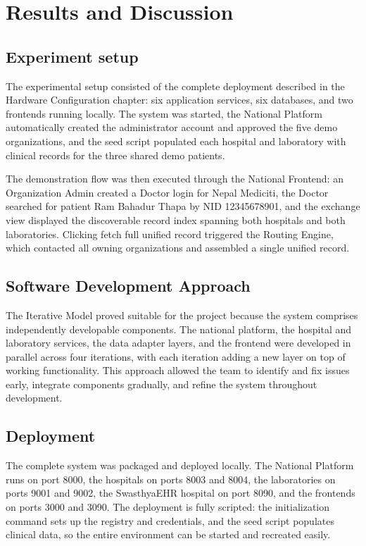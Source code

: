 \documentclass[12pt]{report}
\numberwithin{equation}{chapter}
\begin{document}
\chapter{Results and Discussion}

\section{Experiment setup}
The experimental setup consisted of the complete deployment described in the Hardware Configuration chapter: six application services, six databases, and two frontends running locally. The system was started, the National Platform automatically created the administrator account and approved the five demo organizations, and the seed script populated each hospital and laboratory with clinical records for the three shared demo patients.

The demonstration flow was then executed through the National Frontend: an Organization Admin created a Doctor login for Nepal Mediciti, the Doctor searched for patient Ram Bahadur Thapa by NID 12345678901, and the exchange view displayed the discoverable record index spanning both hospitals and both laboratories. Clicking fetch full unified record triggered the Routing Engine, which contacted all owning organizations and assembled a single unified record.

\section{Software Development Approach}
The Iterative Model proved suitable for the project because the system comprises independently developable components. The national platform, the hospital and laboratory services, the data adapter layers, and the frontend were developed in parallel across four iterations, with each iteration adding a new layer on top of working functionality. This approach allowed the team to identify and fix issues early, integrate components gradually, and refine the system throughout development.

\section{Deployment}
The complete system was packaged and deployed locally. The National Platform runs on port 8000, the hospitals on ports 8003 and 8004, the laboratories on ports 9001 and 9002, the SwasthyaEHR hospital on port 8090, and the frontends on ports 3000 and 3090. The deployment is fully scripted: the initialization command sets up the registry and credentials, and the seed script populates clinical data, so the entire environment can be started and recreated easily.
\end{document}
